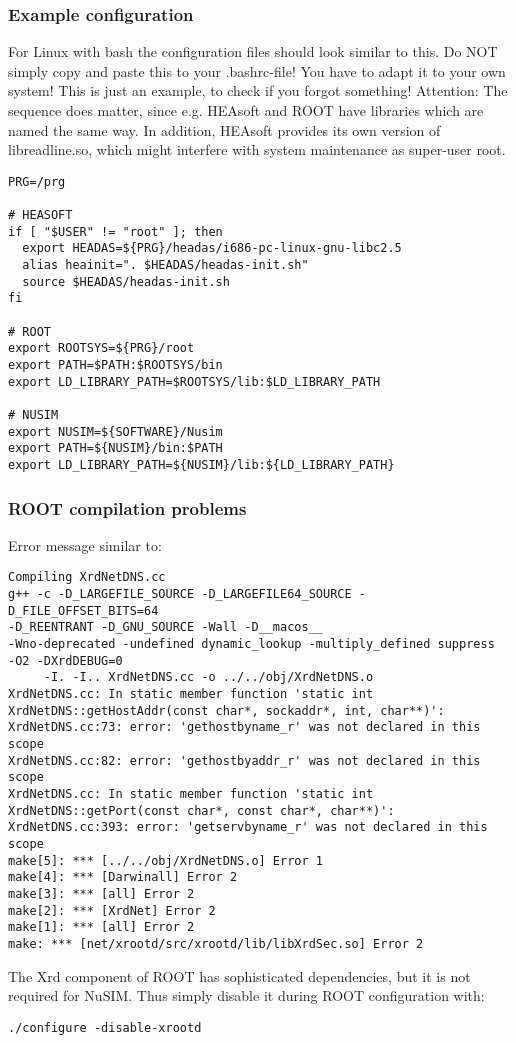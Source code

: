 \subsubsection{Example configuration}
For Linux with bash the configuration files should look similar to this. Do NOT simply copy and paste this to your .bashrc-file! You have to adapt it to your own system! This is just an example, to check if you forgot something! 
Attention: The sequence does matter, since e.g. HEAsoft and ROOT have libraries which are named the same way. In addition, HEAsoft provides its own version of libreadline.so, which might interfere with system maintenance as super-user root. 
 
\begin{verbatim}
PRG=/prg

# HEASOFT
if [ "$USER" != "root" ]; then
  export HEADAS=${PRG}/headas/i686-pc-linux-gnu-libc2.5
  alias heainit=". $HEADAS/headas-init.sh"
  source $HEADAS/headas-init.sh
fi

# ROOT
export ROOTSYS=${PRG}/root
export PATH=$PATH:$ROOTSYS/bin
export LD_LIBRARY_PATH=$ROOTSYS/lib:$LD_LIBRARY_PATH

# NUSIM
export NUSIM=${SOFTWARE}/Nusim
export PATH=${NUSIM}/bin:$PATH
export LD_LIBRARY_PATH=${NUSIM}/lib:${LD_LIBRARY_PATH}
\end{verbatim}

\subsubsection{ROOT compilation problems}

Error message similar to:
{\scriptsize \begin{verbatim}
Compiling XrdNetDNS.cc
g++ -c -D_LARGEFILE_SOURCE -D_LARGEFILE64_SOURCE -D_FILE_OFFSET_BITS=64 
-D_REENTRANT -D_GNU_SOURCE -Wall -D__macos__  
-Wno-deprecated -undefined dynamic_lookup -multiply_defined suppress  -O2 -DXrdDEBUG=0 
     -I. -I.. XrdNetDNS.cc -o ../../obj/XrdNetDNS.o
XrdNetDNS.cc: In static member function 'static int XrdNetDNS::getHostAddr(const char*, sockaddr*, int, char**)':
XrdNetDNS.cc:73: error: 'gethostbyname_r' was not declared in this scope
XrdNetDNS.cc:82: error: 'gethostbyaddr_r' was not declared in this scope
XrdNetDNS.cc: In static member function 'static int XrdNetDNS::getPort(const char*, const char*, char**)':
XrdNetDNS.cc:393: error: 'getservbyname_r' was not declared in this scope
make[5]: *** [../../obj/XrdNetDNS.o] Error 1
make[4]: *** [Darwinall] Error 2
make[3]: *** [all] Error 2
make[2]: *** [XrdNet] Error 2
make[1]: *** [all] Error 2
make: *** [net/xrootd/src/xrootd/lib/libXrdSec.so] Error 2
\end{verbatim}
}
The Xrd component of ROOT has sophisticated dependencies, but it is not required for NuSIM. Thus simply disable it during ROOT configuration with:
\begin{verbatim}
./configure -disable-xrootd
\end{verbatim}


